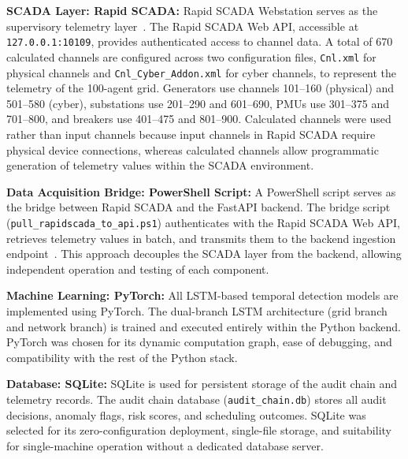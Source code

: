 \par \vspace{0.35cm}
\noindent
\textbf{SCADA Layer: Rapid SCADA:} Rapid SCADA Webstation serves as the supervisory telemetry layer~\cite{martinelli2022method}. The Rapid SCADA Web API, accessible at \texttt{127.0.0.1:10109}, provides authenticated access to channel data. A total of 670 calculated channels are configured across two configuration files, \texttt{Cnl.xml} for physical channels and \mbox{\texttt{Cnl\_Cyber\_Addon.xml}} for cyber channels, to represent the telemetry of the 100-agent grid. Generators use channels 101--160 (physical) and 501--580 (cyber), substations use 201--290 and 601--690, PMUs use 301--375 and 701--800, and breakers use 401--475 and 801--900. Calculated channels were used rather than input channels because input channels in Rapid SCADA require physical device connections, whereas calculated channels allow programmatic generation of telemetry values within the SCADA environment.

\par \vspace{0.35cm}
\noindent
\textbf{Data Acquisition Bridge: PowerShell Script:} A PowerShell script serves as the bridge between Rapid SCADA and the FastAPI backend. The bridge script (\mbox{\texttt{pull\_rapidscada\_to\_api.ps1}}) authenticates with the Rapid SCADA Web API, retrieves telemetry values in batch, and transmits them to the backend ingestion endpoint~\cite{martinelli2022method}. This approach decouples the SCADA layer from the backend, allowing independent operation and testing of each component.

\par \vspace{0.35cm}
\noindent
\textbf{Machine Learning: PyTorch:} All LSTM-based temporal detection models are implemented using PyTorch. The dual-branch LSTM architecture (grid branch and network branch) is trained and executed entirely within the Python backend. PyTorch was chosen for its dynamic computation graph, ease of debugging, and compatibility with the rest of the Python stack.

\par \vspace{0.35cm}
\noindent
\textbf{Database: SQLite:} SQLite is used for persistent storage of the audit chain and telemetry records. The audit chain database (\texttt{audit\_chain.db}) stores all audit decisions, anomaly flags, risk scores, and scheduling outcomes. SQLite was selected for its zero-configuration deployment, single-file storage, and suitability for single-machine operation without a dedicated database server.

